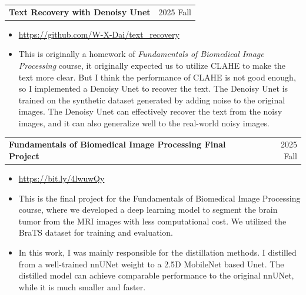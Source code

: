 \documentclass[11pt]{article}
\begin{document}
\begin{tabularx}{\textwidth}{Xr}
\textbf{Text Recovery with Denoisy Unet} &  2025 Fall
\end{tabularx}
\begin{itemize}
    \item \href{https://github.com/W-X-Dai/text_recovery}{https://github.com/W-X-Dai/text\_recovery}
    \item This is originally a homework of \textit{Fundamentals of Biomedical Image Processing} course, it originally expected us to utilize CLAHE to make the text more clear. But I think the performance of CLAHE is not good enough, so I implemented a Denoisy Unet to recover the text. The Denoisy Unet is trained on the synthetic dataset generated by adding noise to the original images. The Denoisy Unet can effectively recover the text from the noisy images, and it can also generalize well to the real-world noisy images.
\end{itemize}
\begin{tabularx}{\textwidth}{Xr}
\textbf{Fundamentals of Biomedical Image Processing Final Project} & 2025 Fall
\end{tabularx}
\begin{itemize}
    \item \href{https://bit.ly/4lwuwQy}{https://bit.ly/4lwuwQy}
    \item This is the final project for the Fundamentals of Biomedical Image Processing course, where we developed a deep learning model to segment the brain tumor from the MRI images with less computational cost. We utilized the BraTS dataset for training and evaluation. 
    \item In this work, I was mainly responsible for the distillation methods. I distilled from a well-trained nnUNet weight to a 2.5D MobileNet based Unet. The distilled model can achieve comparable performance to the original nnUNet, while it is much smaller and faster. 
\end{itemize}
\end{document}
